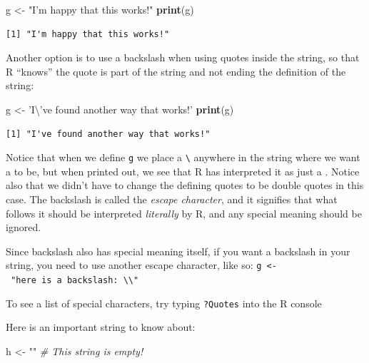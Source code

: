 \documentclass[
]{article}
\newenvironment{Shaded}{\begin{snugshade}}{\end{snugshade}}
\newcommand{\CharTok}[1]{\textcolor[rgb]{0.31,0.60,0.02}{#1}}
\newcommand{\CommentTok}[1]{\textcolor[rgb]{0.56,0.35,0.01}{\textit{#1}}}
\newcommand{\KeywordTok}[1]{\textcolor[rgb]{0.13,0.29,0.53}{\textbf{#1}}}
\newcommand{\NormalTok}[1]{#1}
\newcommand{\StringTok}[1]{\textcolor[rgb]{0.31,0.60,0.02}{#1}}
\newenvironment{bonus}{
  \specialblock{bonus}{sun-fill.png}{Bonus}
}{\endspecialblock}
\begin{document}
\begin{Shaded}
\begin{Highlighting}[]
\NormalTok{g <-}\StringTok{ "I'm happy that this works!"}
\KeywordTok{print}\NormalTok{(g)}
\end{Highlighting}
\end{Shaded}

\begin{verbatim}
[1] "I'm happy that this works!"
\end{verbatim}

Another option is to use a backslash when using quotes inside the string, so that R ``knows'' the quote is part of the string and not ending the definition of the string:

\begin{Shaded}
\begin{Highlighting}[]
\NormalTok{g <-}\StringTok{ 'I}\CharTok{\textbackslash{}'}\StringTok{ve found another way that works!'}
\KeywordTok{print}\NormalTok{(g)}
\end{Highlighting}
\end{Shaded}

\begin{verbatim}
[1] "I've found another way that works!"
\end{verbatim}

Notice that when we define \texttt{g} we place a \texttt{\textbackslash{}\textquotesingle{}} anywhere in the string where we want a \texttt{\textquotesingle{}} to be, but when printed out, we see that R has interpreted it as just a \texttt{\textquotesingle{}}.
Notice also that we didn't have to change the defining quotes to be double quotes in this case.
The backslash is called the \emph{escape character}, and it signifies that what follows it should be interpreted \emph{literally} by R, and any special meaning should be ignored.

\begin{bonus}
Since backslash also has special meaning itself, if you want a backslash
in your string, you need to use another escape character, like so:
\texttt{g\ \textless{}-\ "here\ is\ a\ backslash:\ \textbackslash{}\textbackslash{}"}

To see a list of special characters, try typing \texttt{?Quotes} into
the R console
\end{bonus}

Here is an important string to know about:

\begin{Shaded}
\begin{Highlighting}[]
\NormalTok{h <-}\StringTok{ ""}              \CommentTok{# This string is empty!}
\end{Highlighting}
\end{Shaded}
\end{document}
